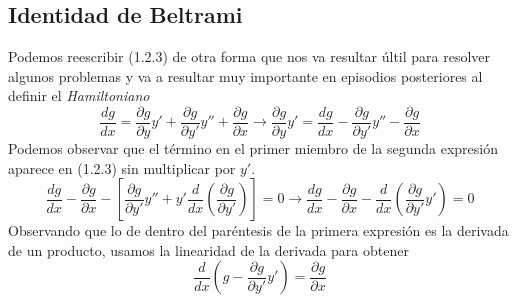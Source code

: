 \subsection{Identidad de Beltrami}
Podemos reescribir (1.2.3) de otra forma que nos va resultar últil para resolver algunos problemas y va a resultar muy importante en episodios posteriores al definir el \textit{Hamiltoniano}
\[\frac{dg}{dx} = \frac{\partial g}{\partial y} y' + \frac{\partial g}{\partial y'}y'' + \frac{\partial g}{\partial x}\rightarrow \frac{\partial g}{\partial y} y' = \frac{dg}{dx} - \frac{\partial g}{\partial y'}y'' - \frac{\partial g}{\partial x}\]
Podemos observar que el término en el primer miembro de la segunda expresión aparece en (1.2.3) sin multiplicar por $y'$.
\[\frac{dg}{dx} - \frac{\partial g}{\partial x} - \left[\frac{\partial g}{\partial y'}y'' + y' \frac{d}{dx}\left(\frac{\partial g}{\partial y'}\right)\right]=0 \rightarrow \frac{dg}{dx} - \frac{\partial g}{\partial x} - \frac{d}{dx}\left(\frac{\partial g}{\partial y'}y'\right)=0\]
Observando que lo de dentro del paréntesis de la primera expresión es la derivada de un producto, usamos la linearidad de la derivada para obtener
\begin{equation} \label{1.3.4}
    \frac{d}{dx}\left(g -\frac{\partial g}{\partial y'}y'\right)=\frac{\partial g}{\partial x}
\end{equation}

